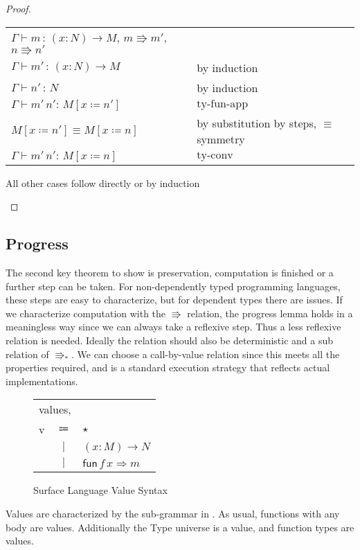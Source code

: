 \begin{proof}
\begin{casenv}
  \begin{tabular}{ll}
    $\Gamma\vdash m\,:\,\left(x:N\right)\rightarrow M$, $m\Rrightarrow m'$,
    $n\Rrightarrow n'$ & \tabularnewline
    $\Gamma\vdash m'\,:\,\left(x:N\right)\rightarrow M$ & by induction\tabularnewline
    $\Gamma\vdash n'\,:\,N$ & by induction\tabularnewline
    $\Gamma\vdash m'\,n':\,M\left[x\coloneqq n'\right]$ & $\textrm{ty-fun-app}$\tabularnewline
    $M\left[x\coloneqq n'\right]\equiv M\left[x\coloneqq n\right]$ & by substitution by steps, $\equiv$ symmetry\tabularnewline
    $\Gamma\vdash m'\,n':\,M\left[x\coloneqq n\right]$ & $\textrm{ty-conv}$\tabularnewline
  \end{tabular}
  \item All other cases follow directly or by induction
\end{casenv}
\end{proof}

\subsection{Progress}

The second key theorem to show is preservation, computation is finished or a further step can be taken.
For non-dependently typed programming languages, these steps are easy to characterize, but for dependent types there are issues.
If we characterize computation with the $\Rrightarrow$ relation, the progress lemma holds in a meaningless way since we can always take a reflexive step.
Thus a less reflexive relation is needed.
Ideally the relation should also be deterministic and a sub relation of $\Rrightarrow_{*}$.
We can choose a call-by-value relation since this meets all the properties required, and is a standard execution strategy that reflects actual implementations.

\begin{figure}
\begin{tabular}{lcl}
\multicolumn{3}{l}{values,}\tabularnewline
v & $\Coloneqq$ & $\star$\tabularnewline
  & $|$ & $\left(x:M\right)\rightarrow N$\tabularnewline
  & $|$ & $\mathsf{fun}\,f\,x\Rightarrow m$\tabularnewline
\end{tabular}\caption{Surface Language Value Syntax}
\label{fig:surface-value-syntax}
\end{figure}

Values are characterized by the sub-grammar in .
As usual, functions with any body are values.
Additionally the Type universe is a value, and function types are values.

